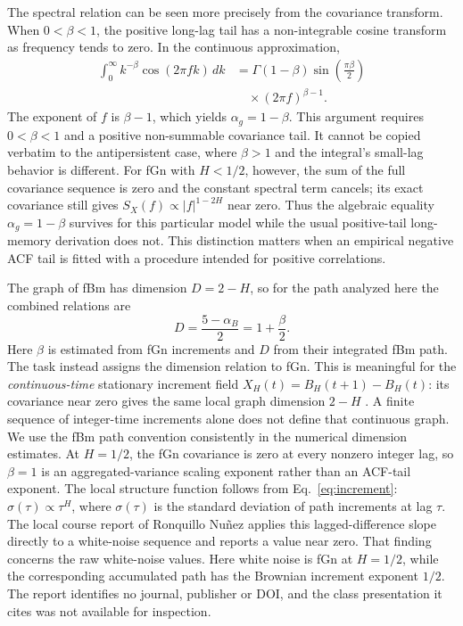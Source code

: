 \documentclass[12pt,twocolumn]{article}
\begin{document}
The spectral relation can be seen more precisely from the covariance transform. When $0<\beta<1$, the positive long-lag tail has a non-integrable cosine transform as frequency tends to zero. In the continuous approximation,
\begin{equation}
\begin{aligned}
\int_0^\infty k^{-\beta}\cos(2\pi f k)\,dk
&=\Gamma(1-\beta)\sin\left(\frac{\pi\beta}{2}\right)\\
&\quad\times(2\pi f)^{\beta-1}.
\end{aligned}
\label{eq:cosine}
\end{equation}
The exponent of $f$ is $\beta-1$, which yields $\alpha_g=1-\beta$. This argument requires $0<\beta<1$ and a positive non-summable covariance tail. It cannot be copied verbatim to the antipersistent case, where $\beta>1$ and the integral's small-lag behavior is different. For fGn with $H<1/2$, however, the sum of the full covariance sequence is zero and the constant spectral term cancels; its exact covariance still gives $S_X(f)\propto|f|^{1-2H}$ near zero. Thus the algebraic equality $\alpha_g=1-\beta$ survives for this particular model while the usual positive-tail long-memory derivation does not. This distinction matters when an empirical negative ACF tail is fitted with a procedure intended for positive correlations.

The graph of fBm has dimension $D=2-H$, so for the path analyzed here the combined relations are
\begin{equation}
 D=\frac{5-\alpha_B}{2}=1+\frac{\beta}{2}.
 \label{eq:dimension}
\end{equation}
Here $\beta$ is estimated from fGn increments and $D$ from their integrated fBm path. The task instead assigns the dimension relation to fGn. This is meaningful for the \emph{continuous-time} stationary increment field $X_H(t)=B_H(t+1)-B_H(t)$: its covariance near zero gives the same local graph dimension $2-H$ \cite{gneiting2004}. A finite sequence of integer-time increments alone does not define that continuous graph. We use the fBm path convention consistently in the numerical dimension estimates. At $H=1/2$, the fGn covariance is zero at every nonzero integer lag, so $\beta=1$ is an aggregated-variance scaling exponent rather than an ACF-tail exponent. The local structure function follows from Eq.~\eqref{eq:increment}: $\sigma(\tau)\propto\tau^H$, where $\sigma(\tau)$ is the standard deviation of path increments at lag $\tau$. The local course report of Ronquillo Nu\~nez \cite{ronquillo2026} applies this lagged-difference slope directly to a white-noise sequence and reports a value near zero. That finding concerns the raw white-noise values. Here white noise is fGn at $H=1/2$, while the corresponding accumulated path has the Brownian increment exponent $1/2$. The report identifies no journal, publisher or DOI, and the class presentation it cites was not available for inspection.
\end{document}
